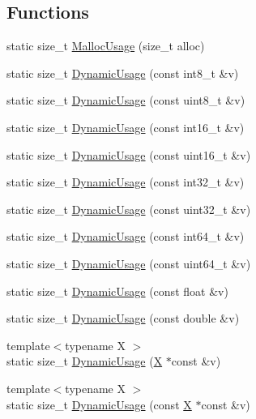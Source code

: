 \subsection*{Functions}
\begin{DoxyCompactItemize}
\item 
static size\+\_\+t \mbox{\hyperlink{namespacememusage_ae8ade104f83bf4c608c282adc365bf90}{Malloc\+Usage}} (size\+\_\+t alloc)
\item 
static size\+\_\+t \mbox{\hyperlink{namespacememusage_a24d4e7ba4b087b7c854e819c37e20ea0}{Dynamic\+Usage}} (const int8\+\_\+t \&v)
\item 
static size\+\_\+t \mbox{\hyperlink{namespacememusage_acf15bdba7e4327aa5d5d1fe71eca19a3}{Dynamic\+Usage}} (const uint8\+\_\+t \&v)
\item 
static size\+\_\+t \mbox{\hyperlink{namespacememusage_acdf1e4b51f6362bd060fb640da9f1992}{Dynamic\+Usage}} (const int16\+\_\+t \&v)
\item 
static size\+\_\+t \mbox{\hyperlink{namespacememusage_a401067c879de08c2db0cae8c91b70e9f}{Dynamic\+Usage}} (const uint16\+\_\+t \&v)
\item 
static size\+\_\+t \mbox{\hyperlink{namespacememusage_af7aa88a5ff4779ae179c244ef00e1921}{Dynamic\+Usage}} (const int32\+\_\+t \&v)
\item 
static size\+\_\+t \mbox{\hyperlink{namespacememusage_a0dc5b5e3dd169bc4e55cc7d74e08a46a}{Dynamic\+Usage}} (const uint32\+\_\+t \&v)
\item 
static size\+\_\+t \mbox{\hyperlink{namespacememusage_a3ca0c4527f3847272d6c61c5f1f6825a}{Dynamic\+Usage}} (const int64\+\_\+t \&v)
\item 
static size\+\_\+t \mbox{\hyperlink{namespacememusage_a920f8ca7a8fde31a5c02699b16a47183}{Dynamic\+Usage}} (const uint64\+\_\+t \&v)
\item 
static size\+\_\+t \mbox{\hyperlink{namespacememusage_a43d740dc101dc4ecb6368281f79e7e17}{Dynamic\+Usage}} (const float \&v)
\item 
static size\+\_\+t \mbox{\hyperlink{namespacememusage_a17336b4c23b938ac4a7bbd2d130a0bc3}{Dynamic\+Usage}} (const double \&v)
\item 
{\footnotesize template$<$typename X $>$ }\\static size\+\_\+t \mbox{\hyperlink{namespacememusage_a395d10b121d3d86b2211a46f017ca304}{Dynamic\+Usage}} (\mbox{\hyperlink{net_8cpp_a826edd40636cbaa44266b97c8c6a4fa3}{X}} $\ast$const \&v)
\item 
{\footnotesize template$<$typename X $>$ }\\static size\+\_\+t \mbox{\hyperlink{namespacememusage_ad9b1d01b0cba84932757c4fc1e35a267}{Dynamic\+Usage}} (const \mbox{\hyperlink{net_8cpp_a826edd40636cbaa44266b97c8c6a4fa3}{X}} $\ast$const \&v)

\end{DoxyCompactItemize}
